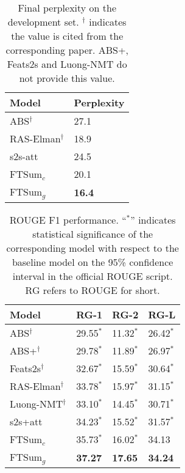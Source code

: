 \documentclass[letterpaper]{article} \usepackage{aaai18}  \usepackage{times}  \usepackage{helvet}  \usepackage{courier}  \usepackage{url}  \usepackage{graphicx}  \usepackage{amsfonts}
\begin{document}
	\begin{table}
		\centering
		\begin{tabular}{l|l}
			\hline
			Model     & Perplexity \\ \hline
			ABS$^\dag$       & 27.1       \\
			RAS-Elman$^\dag$ & 18.9       \\
			s2s-att   & 24.5       \\
			FTSum$_c$     & 20.1       \\
			FTSum$_g$     & \textbf{16.4}       \\ \hline
		\end{tabular}
		\caption{Final perplexity on the development set. $^\dag$ indicates the value is cited from the corresponding paper. ABS+, Feats2s and Luong-NMT do not provide this value.}
		\label{tb:ppl}
	\end{table}
	
	\begin{table}
		\centering
		\begin{tabular}{l|lll}
			\hline
			Model     & RG-1 & RG-2 & RG-L \\ \hline
			ABS$^\dag$       & 29.55$^*$  & 11.32$^*$  & 26.42$^*$  \\
			ABS+$^\dag$      & 29.78$^*$  & 11.89$^*$  & 26.97$^*$  \\
			Feats2s$^\dag$   & 32.67$^*$  & 15.59$^*$   & 30.64$^*$  \\
			RAS-Elman$^\dag$ & 33.78$^*$  & 15.97$^*$   & 31.15$^*$  \\
			Luong-NMT$^\dag$ & 33.10$^*$  & 14.45$^*$  & 30.71$^*$  \\
			s2s+att   & 34.23$^*$  & 15.52$^*$  & 31.57$^*$  \\ \hline
			FTSum$_c$     & 35.73$^*$   & 16.02$^*$   & 34.13   \\
			FTSum$_g$     & \textbf{37.27}   & \textbf{17.65}   & \textbf{34.24}   \\ \hline
		\end{tabular}
		\caption{ROUGE F1 performance. ``$^*$'' indicates statistical significance of the corresponding model with respect to the baseline model on the 95\% confidence interval in the official ROUGE script. RG refers to ROUGE for short.}
		\label{tb:rouge}
	\end{table}
	
\end{document}

